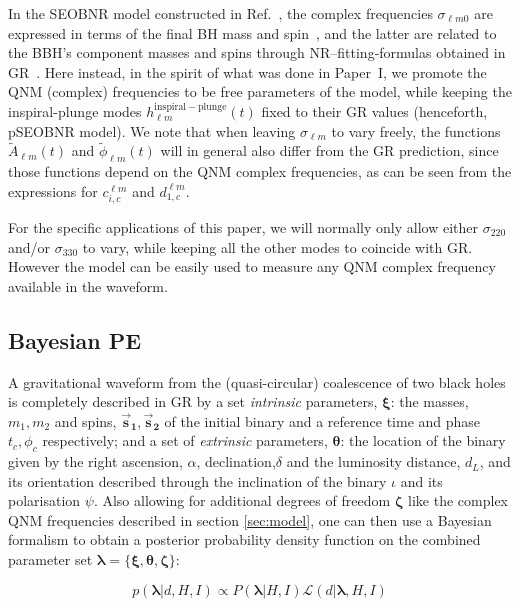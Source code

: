 \documentclass[twocolumn,prd,superscriptaddress,amsfonts,amssymb,amsmath,preprintnumbers]{revtex4-1}
\newcommand{\paperone}{Paper~I\xspace}
\newcommand{\blambda}{\bm{\lambda}}
\newcommand{\btheta}{\bm{\theta}}
\newcommand{\bxi}{\bm{\xi}}
\newcommand{\bzeta}{\bm{\zeta}}
\newcommand{\bs}[1]{\bm{\vec{s}_{#1}}}
\begin{document}
In the SEOBNR model constructed in Ref.~\cite{Cotesta:2018fcv}, the complex frequencies $\sigma_{\ell m 0}$  are expressed in terms of the final BH mass and spin~\cite{Berti:2005ys,Berti:2009kk}, and the latter are related to the BBH's component masses and spins through NR--fitting-formulas obtained in GR~\cite{Taracchini:2013rva,Hofmann:2016yih}. Here instead, in the spirit of what was done in \paperone, we promote the QNM (complex) frequencies to be free parameters of the model, while keeping the inspiral-plunge modes $h_{\ell m}^\mathrm{inspiral-plunge}(t)$ fixed to their GR values (henceforth, pSEOBNR model). 
We note that when leaving $\sigma_{\ell m}$ to vary freely, the functions $\tilde{A}_{\ell m}(t)$ and $\tilde{\phi}_{\ell m}(t)$ will in general also differ from the GR prediction, since those functions depend on the QNM complex frequencies, as can be seen from the expressions for $c_{i,c}^{\ell m}$ and $d_{1,c}^{\ell m}$.

For the specific applications of this paper, we will normally only allow either $\sigma_{220}$ and/or $\sigma_{330}$ to vary, while keeping all the other modes to coincide with GR. However the model can be easily used to measure any QNM complex frequency available in the waveform.

\subsection{Bayesian PE}\label{sec:method}

A gravitational waveform from the (quasi-circular) coalescence of two black holes is completely described in GR by a set \textit{intrinsic} parameters, $\bxi$: the masses, $m_1, m_2$ and spins, $\bs1, \bs2$ of the initial binary and a reference time and phase $t_c, \phi_c$ respectively; and a set of \textit{extrinsic} parameters, $\btheta$: the location of the binary given by the right ascension, $\alpha$, declination,$\delta$ and the luminosity distance, $d_L$, and its orientation described through the inclination of the binary $\iota$ and its polarisation $\psi$. Also allowing for additional degrees of freedom $\bzeta$ like the complex QNM frequencies described in section \ref{sec:model}, one can then use a Bayesian formalism to obtain a posterior probability density function on the combined parameter set $\blambda = \{\bxi, \btheta, \bzeta\}$:

\begin{equation}
p(\blambda | d, H, I) \propto P(\blambda | H,I) \mathcal{L}(d | \blambda, H, I)
\end{equation}
\end{document}

